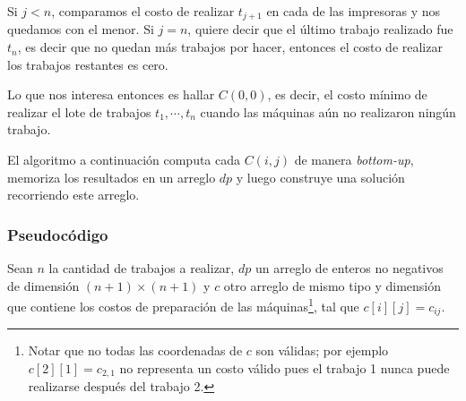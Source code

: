 \documentclass[a4paper, 10pt, twoside]{article}
\begin{document}
Si $j < n$, comparamos el costo de realizar $t_{j + 1}$ en cada de las impresoras y nos quedamos con el menor. Si $j = n$, quiere decir que el último trabajo realizado fue $t_n$, es decir que no quedan más trabajos por hacer, entonces el costo de realizar los trabajos restantes es cero.

Lo que nos interesa entonces es hallar $C(0, 0)$, es decir, el costo mínimo de realizar el lote de trabajos $t_1, \cdots, t_n$ cuando las máquinas aún no realizaron ningún trabajo.

El algoritmo a continuación computa cada $C(i, j)$ de manera \textit{bottom-up}, memoriza los resultados en un arreglo $dp$ y luego construye una solución recorriendo este arreglo.


\subsubsection{Pseudocódigo}

Sean $n$ la cantidad de trabajos a realizar, $dp$ un arreglo de enteros no negativos de dimensión $(n + 1) \times (n + 1)$ y $c$ otro arreglo de mismo tipo y dimensión que contiene los costos de preparación de las máquinas\footnote{Notar que no todas las coordenadas de $c$ son válidas; por ejemplo $c[2][1] = c_{2,1}$ no representa un costo válido pues el trabajo 1 nunca puede realizarse después del trabajo 2.}, tal que $c[i][j] = c_{ij}$.
\end{document}
